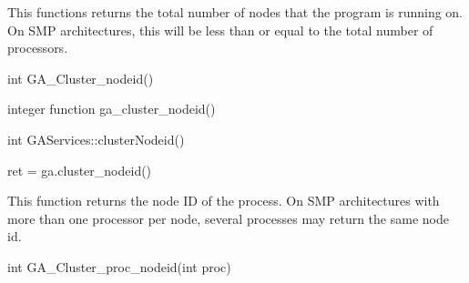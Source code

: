 \documentclass[10pt]{article}
\begin{document}
\local

\begin{desc}

This functions returns the total number of nodes that the program is running
on. On SMP architectures, this will be less than or equal to the total number
of processors.

\end{desc}


\begin{capi}
\begin{ccode}
int GA_Cluster_nodeid()
\end{ccode}
\end{capi}

\begin{fapi}
\begin{fcode}
integer function ga_cluster_nodeid()
\end{fcode}
\end{fapi}

\begin{cxxapi}
\begin{cxxcode}
int GAServices::clusterNodeid()
\end{cxxcode}
\end{cxxapi}

\begin{pyapi}
\begin{pycode}
ret = ga.cluster_nodeid()
\end{pycode}
\end{pyapi}

\local

\begin{desc}

This function returns the node ID of the process. On SMP architectures with
more than one processor per node, several processes may return the same node
id.

\end{desc}


\begin{capi}
\begin{ccode}
int GA_Cluster_proc_nodeid(int proc)
\end{ccode}
\begin{funcargs}
\end{funcargs}
\end{capi}
\end{document}
